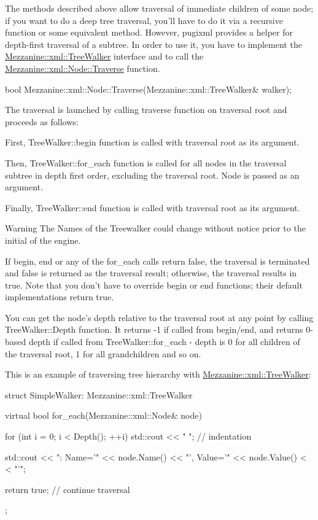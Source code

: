 The methods described above allow traversal of immediate children of some node; if you want to do a deep tree traversal, you'll have to do it via a recursive function or some equivalent method. However, pugixml provides a helper for depth-\/first traversal of a subtree. In order to use it, you have to implement the \hyperlink{classMezzanine_1_1xml_1_1TreeWalker}{Mezzanine::xml::TreeWalker} interface and to call the \hyperlink{classMezzanine_1_1xml_1_1Node_a3115c4b78afaa9b27a54c1d4200dbcc7}{Mezzanine::xml::Node::Traverse} function. 
\begin{DoxyCode}
 bool Mezzanine::xml::Node::Traverse(Mezzanine::xml::TreeWalker& walker);
\end{DoxyCode}
 The traversal is launched by calling traverse function on traversal root and proceeds as follows:
\begin{DoxyItemize}
\item First, TreeWalker::begin function is called with traversal root as its argument.
\item Then, TreeWalker::for\_\-each function is called for all nodes in the traversal subtree in depth first order, excluding the traversal root. Node is passed as an argument.
\item Finally, TreeWalker::end function is called with traversal root as its argument.
\end{DoxyItemize}

\begin{DoxyWarning}{Warning}
The Names of the Treewalker could change without notice prior to the initial of the engine.
\end{DoxyWarning}
If begin, end or any of the for\_\-each calls return false, the traversal is terminated and false is returned as the traversal result; otherwise, the traversal results in true. Note that you don't have to override begin or end functions; their default implementations return true. \par
 \par
 You can get the node's depth relative to the traversal root at any point by calling TreeWalker::Depth function. It returns -\/1 if called from begin/end, and returns 0-\/based depth if called from TreeWalker::for\_\-each -\/ depth is 0 for all children of the traversal root, 1 for all grandchildren and so on. \par
 \par
 This is an example of traversing tree hierarchy with \hyperlink{classMezzanine_1_1xml_1_1TreeWalker}{Mezzanine::xml::TreeWalker}: 
\begin{DoxyCode}
 struct SimpleWalker: Mezzanine::xml::TreeWalker
 {
     virtual bool for_each(Mezzanine::xml::Node& node)
     {
         for (int i = 0; i < Depth(); ++i) std::cout << "  "; // indentation

         std::cout << ": Name='" << node.Name() << "', Value='" << node.Value() <
      < "'\n";

         return true; // continue traversal
     }
 };
\end{DoxyCode}
 
